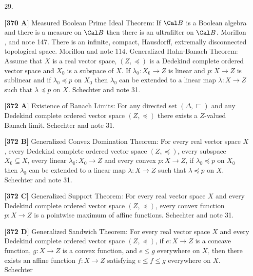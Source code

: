 29.  
\smallskip
\item{}{\bf [370 A]} Measured Boolean Prime Ideal Theorem: If $\Cal B$
is a Boolean algebra and there is a measure on $\Cal B$ then there is
an ultrafilter on $\Cal B$.  \ac{Morillon} \cite{1989}, \cite{1990}
and note 147.
\medskip
{}  There is an infinite, compact, Hausdorff,
extremally disconnected topological space.  \ac{Morillon} \cite{1993}
and note 114.
\medskip
{} Generalized Hahn-Banach Theorem:  Assume that
$X$ is a real vector space, $(Z,\preccurlyeq)$ is a Dedekind
complete ordered vector space and $X_0$ is a subspace
of $X$.  If $\lambda_0 : X_0 \to Z$ is linear and
$p: X\to Z$ is sublinear and if $\lambda_0 \preccurlyeq p$
on $X_0$ then $\lambda_0$ can be extended to a linear map
$\lambda : X\to Z$ such that $\lambda \preccurlyeq p$ on $X$.
\ac{Schechter} \cite{1996b} and note 31. 
\smallskip
\item{}{\bf [372 A]} Existence of Banach Limits:  For any directed set
$(\Delta,\sqsubseteq)$ and any Dedekind complete ordered vector
space $(Z,\preccurlyeq)$ there exists a $Z$-valued Banach limit.
\ac{Schechter} \cite{1996b} and note 31.
\smallskip
\item{}{\bf [372 B]} Generalized Convex Domination Theorem:
For every real vector space
$X$, every Dedekind complete ordered vector space $(Z,\preccurlyeq)$,
every subspace $X_0\subseteq X$, every linear $\lambda_0 :X_0\to
Z$ and every convex $p: X\to Z$, if $\lambda_0 \preccurlyeq p$
on $X_0$ then $\lambda_0$ can be extended to a linear map $\lambda:
X\to Z $ such that $\lambda \preccurlyeq p$ on $X$.
\ac{Schechter} \cite{1996b} and note 31. 
\smallskip
\item{}{\bf [372 C]}  Generalized Support Theorem:  For every real
vector space $X$ and every Dedekind complete ordered vector space
$(Z,\preccurlyeq)$, every convex function $p: X\to Z$
is a pointwise maximum of affine functions.  \ac{Schechter} \cite{1996b}
and note 31. 
\smallskip
\item{}{\bf [372 D]} Generalized Sandwich Theorem:  For every real vector
space $X$ and every Dedekind complete ordered vector space
$(Z,\preccurlyeq)$, if $e: X\to Z$ is a concave function,
$g: X\to Z$ is a convex function, and $e\le g$ everywhere
on $X$, then there exists an affine function $f: X \to Z$
satisfying $e \le f \le g$ everywhere on $X$.  \ac{Schechter} \cite{1996b}

